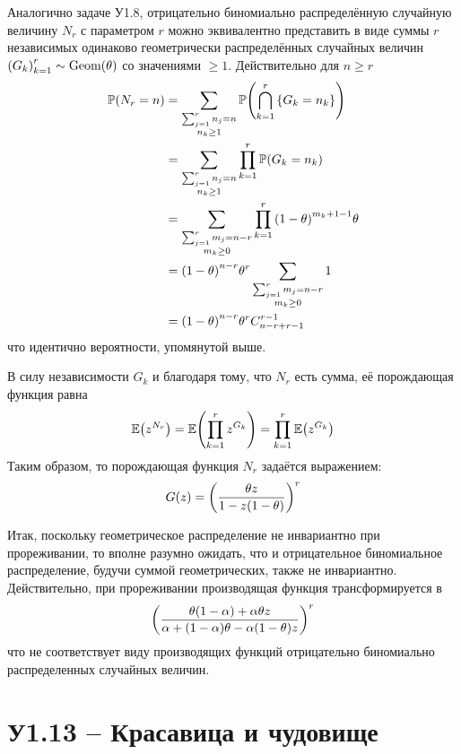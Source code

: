 \documentclass[a4paper]{article}
\let\originalleft\left
\let\originalright\right
\renewcommand{\left}{\mathopen{}\mathclose\bgroup\originalleft}
\renewcommand{\right}{\aftergroup\egroup\originalright}
\newcommand{\obj}[1]{{\left\{ #1 \right \}}}
\newcommand{\brac}[1]{{\left ( #1 \right )}}
\newcommand{\Ex}[0]{{\mathbb{E}}}
\newcommand{\pr}[0]{{\mathbb{P}}}
\begin{document}
Аналогично задаче У1.8, отрицательно биномиально распределённую случайную
величину $N_r$ с параметром $r$ можно эквивалентно представить в виде суммы
$r$ независимых одинаково геометрически распределённых случайных величин
$\brac{G_k}_{k=1}^r\sim \text{Geom}(\theta)$ со значениями $\geq1$.
Действительно для $n\geq r$ \begin{align*}
	\pr\brac{N_r = n} &= \sum_{\substack{\sum_{j=1}^r n_j = n \\ n_k\geq1}} \pr\brac{\bigcap_{k=1}^r \obj{G_k = n_k}} \\
	&= \sum_{\substack{\sum_{j=1}^r n_j = n \\ n_k\geq1}} \prod_{k=1}^r \pr\brac{G_k = n_k} \\
	&= \sum_{\substack{\sum_{j=1}^r m_j = n-r \\ m_k\geq0}} \prod_{k=1}^r {(1-\theta)}^{m_k+1-1} \theta \\
	&= {(1-\theta)}^{n-r} \theta^r \sum_{\substack{\sum_{j=1}^r m_j = n-r \\ m_k\geq0}} 1\\
	&= {(1-\theta)}^{n-r} \theta^r C^{r-1}_{n-r+r-1}\\
\end{align*}
что идентично вероятности, упомянутой выше.

В силу независимости $G_k$ и благодаря тому, что $N_r$ есть сумма, её
порождающая функция равна
\[\Ex\brac{z^{N_r}}=\Ex\brac{\prod_{k=1}^r z^{G_k}}=\prod_{k=1}^r \Ex\brac{z^{G_k}}\]
Таким образом, то порождающая функция $N_r$ задаётся выражением:
\[G(z) = \brac{\frac{\theta z }{1 - z (1-\theta)}}^r\]

Итак, поскольку геометрическое распределение не инвариантно при прореживании,
то вполне разумно ожидать, что и отрицательное биномиальное распределение,
будучи суммой геометрических, также не инвариантно.
Действительно, при прореживании производящая функция трансформируется в 
\[\brac{\frac{\theta (1 - \alpha) + \alpha \theta z }{\alpha + (1-\alpha) \theta - \alpha (1-\theta) z}}^r\]
что не соответствует виду производящих функций отрицательно биномиально
распределенных случайных величин.



\section{У1.13 -- Красавица и чудовище} %
\label{sec:task_1_13}
\end{document}
